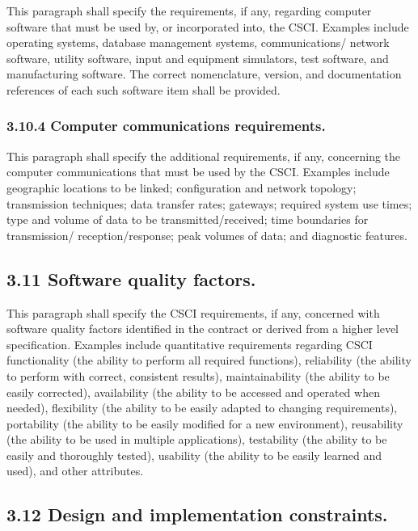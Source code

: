 This paragraph shall specify the requirements, if any, regarding
computer software that must be used by, or incorporated into, the CSCI.
Examples include operating systems, database management systems,
communications/ network software, utility software, input and equipment
simulators, test software, and manufacturing software. The correct
nomenclature, version, and documentation references of each such
software item shall be provided.

\subsubsection{3.10.4 Computer communications requirements.}

This paragraph shall specify the additional requirements, if any,
concerning the computer communications that must be used by the CSCI.
Examples include geographic locations to be linked; configuration and
network topology; transmission techniques; data transfer rates;
gateways; required system use times; type and volume of data to be
transmitted/received; time boundaries for transmission/
reception/response; peak volumes of data; and diagnostic features.

\subsection{3.11 Software quality factors.}

This paragraph shall specify the CSCI requirements, if any, concerned
with software quality factors identified in the contract or derived from
a higher level specification. Examples include quantitative requirements
regarding CSCI functionality (the ability to perform all required
functions), reliability (the ability to perform with correct, consistent
results), maintainability (the ability to be easily corrected),
availability (the ability to be accessed and operated when needed),
flexibility (the ability to be easily adapted to changing requirements),
portability (the ability to be easily modified for a new environment),
reusability (the ability to be used in multiple applications),
testability (the ability to be easily and thoroughly tested), usability
(the ability to be easily learned and used), and other attributes.

\subsection{3.12 Design and implementation constraints.}

